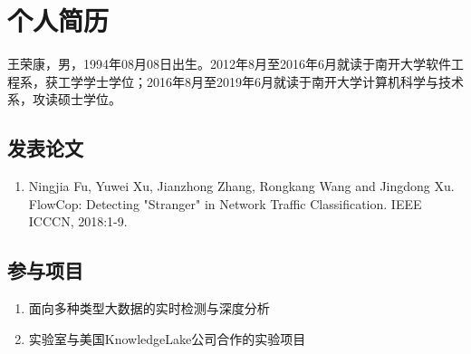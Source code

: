 

\chapter*{个人简历}
王荣康，男，1994年08月08日出生。2012年8月至2016年6月就读于南开大学软件工程系，获工学学士学位；2016年8月至2019年6月就读于南开大学计算机科学与技术系，攻读硕士学位。
\section*{发表论文}
\begin{enumerate}
\renewcommand{\labelenumi}{[\theenumi]}
\item Ningjia Fu, Yuwei Xu, Jianzhong Zhang, Rongkang Wang and Jingdong Xu. FlowCop: Detecting "Stranger" in Network Traffic Classification. IEEE ICCCN, 2018:1-9.

\end{enumerate}
\section*{参与项目}
\begin{enumerate}
\renewcommand{\labelenumi}{[\theenumi]}
\item 面向多种类型大数据的实时检测与深度分析
\item 实验室与美国KnowledgeLake公司合作的实验项目
\end{enumerate}